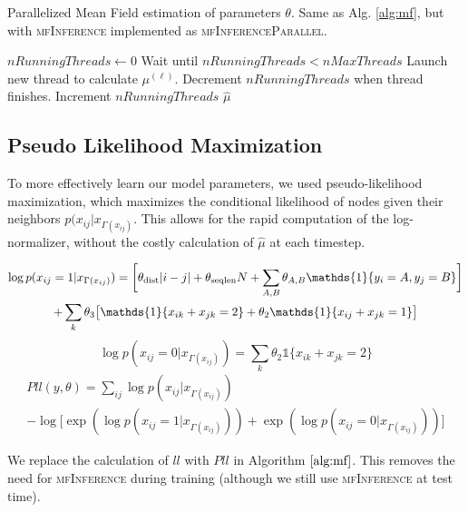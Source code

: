 \documentclass{article}
\begin{document}
\begin{algorithm}
\caption{Parallelized Mean Field estimation of parameters $\theta$. Same as Alg. \ref{alg:mf}, but with \textsc{mfInference} implemented as \textsc{mfInferenceParallel}.}\label{alg:mf_parallel}
\begin{algorithmic}
	\State $nRunningThreads \gets 0$
		\State Wait until $nRunningThreads < nMaxThreads$
		\State Launch new thread to calculate $\mu^{(\ell)}$. Decrement $nRunningThreads$ when thread finishes.
		\State Increment $nRunningThreads$
	\EndFor
	\State \Return $\hat{\mu}$
\EndFunction
\end{algorithmic}
\end{algorithm}

\subsection{Pseudo Likelihood Maximization}

To more effectively learn our model parameters, we used pseudo-likelihood maximization, which maximizes the conditional likelihood of nodes given their neighbors $p(x_{ij} | x_{\Gamma(x_{ij})}$. This allows for the rapid computation of the log-normalizer, without the costly calculation of $\hat{\mu}$ at each timestep. 

\begin{multline*}
\log p(x_{ij} = 1 | x_{\Gamma(x_{ij})}) = \bigg[\theta_{\textmd{dist}}|i - j|+ \theta_{\textmd{seqlen}}N + \sum_{A, B} \theta_{A, B}\mathds{1}\{y_i = A, y_j = B\}\bigg] \\
+ \sum_k \theta_3 \big[\mathds{1}\{ x_{ik} + x_{jk} = 2\}  + \theta_2 \mathds{1}\{x_{ij} + x_{jk} = 1\} \big]
\end{multline*}
\begin{equation*}
\log p(x_{ij} = 0 | x_{\Gamma(x_{ij})}) =  \sum_k \theta_2 \mathds{1}\{ x_{ik} + x_{jk} = 2\}
\end{equation*}
\begin{multline} \label{eq:pll}
Pll(y, \theta) = \sum_{ij} \log p(x_{ij} | x_{\Gamma(x_{ij})}) \\
- \log \bigg[\exp( \log p(x_{ij} = 1 | x_{\Gamma(x_{ij})})) + \exp( \log p(x_{ij} = 0 | x_{\Gamma(x_{ij})})) \bigg]
\end{multline}

We replace the calculation of $ll$ with $Pll$ in Algorithm $\ref{alg:mf}$. This removes the need for \textsc{mfInference} during training (although we still use \textsc{mfInference} at test time).
\end{document}
